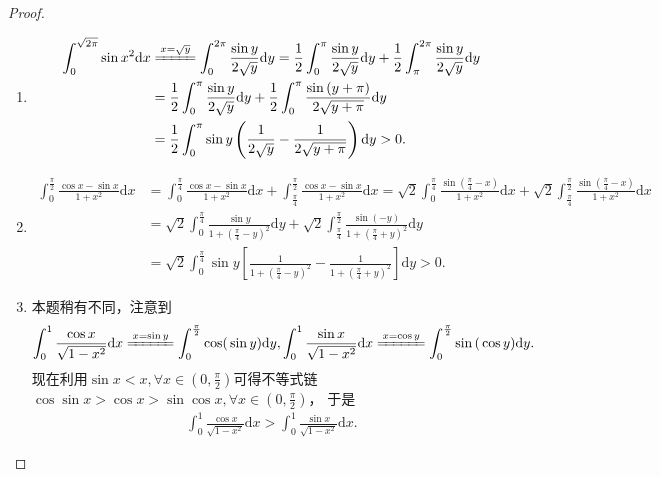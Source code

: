 \documentclass[../../main.tex]{subfiles}%
\begin{document}
\begin{proof}
\begin{enumerate}
\item \begin{align*}
\int_0^{\sqrt{2\pi}}{\sin x^2\mathrm{d}x}&\xlongequal{x=\sqrt{y}}\int_0^{2\pi}{\frac{\sin y}{2\sqrt{y}}\mathrm{d}y}=\frac{1}{2}\int_0^{\pi}{\frac{\sin y}{2\sqrt{y}}\mathrm{d}y}+\frac{1}{2}\int_{\pi}^{2\pi}{\frac{\sin y}{2\sqrt{y}}\mathrm{d}y}
\\
&=\frac{1}{2}\int_0^{\pi}{\frac{\sin y}{2\sqrt{y}}\mathrm{d}y}+\frac{1}{2}\int_0^{\pi}{\frac{\sin \left( y+\pi \right)}{2\sqrt{y+\pi}}\mathrm{d}y}
\\
&=\frac{1}{2}\int_0^{\pi}{\sin y\left( \frac{1}{2\sqrt{y}}-\frac{1}{2\sqrt{y+\pi}} \right) \mathrm{d}y}>0.
\end{align*}

\item \begin{align*}
\int_0^{\frac{\pi}{2}}{\frac{\cos x-\sin x}{1+x^2}\mathrm{d}x}&=\int_0^{\frac{\pi}{4}}{\frac{\cos x-\sin x}{1+x^2}\mathrm{d}x}+\int_{\frac{\pi}{4}}^{\frac{\pi}{2}}{\frac{\cos x-\sin x}{1+x^2}\mathrm{d}x}=\sqrt{2}\int_0^{\frac{\pi}{4}}{\frac{\sin \left( \frac{\pi}{4}-x \right)}{1+x^2}\mathrm{d}x}+\sqrt{2}\int_{\frac{\pi}{4}}^{\frac{\pi}{2}}{\frac{\sin \left( \frac{\pi}{4}-x \right)}{1+x^2}\mathrm{d}x}
\\
&=\sqrt{2}\int_0^{\frac{\pi}{4}}{\frac{\sin y}{1+\left( \frac{\pi}{4}-y \right) ^2}\mathrm{d}y}+\sqrt{2}\int_{\frac{\pi}{4}}^{\frac{\pi}{2}}{\frac{\sin \left( -y \right)}{1+\left( \frac{\pi}{4}+y \right) ^2}\mathrm{d}y}
\\
&=\sqrt{2}\int_0^{\frac{\pi}{4}}{\sin y\left[ \frac{1}{1+\left( \frac{\pi}{4}-y \right) ^2}-\frac{1}{1+\left( \frac{\pi}{4}+y \right) ^2} \right] \mathrm{d}y}>0.
\end{align*}

\item 本题稍有不同，注意到
\begin{align*}
\int_0^1{\frac{\cos x}{\sqrt{1-x^2}}\mathrm{d}x\xlongequal{x=\sin y}\int_0^{\frac{\pi}{2}}{\mathrm{cos(}\sin y)\mathrm{d}y,\int_0^1{\frac{\sin x}{\sqrt{1-x^2}}\mathrm{d}x\xlongequal{x=\cos y}\int_0^{\frac{\pi}{2}}{\sin\mathrm{(}\cos y)\mathrm{d}y}}}}.
\end{align*}
现在利用\(\sin x < x, \forall x \in (0, \frac{\pi}{2})\)可得不等式链
\(\cos\sin x > \cos x > \sin\cos x, \forall x \in (0, \frac{\pi}{2})\)，
于是
\begin{align*}
\int_{0}^{1}\frac{\cos x}{\sqrt{1 - x^{2}}}\mathrm{d}x > \int_{0}^{1}\frac{\sin x}{\sqrt{1 - x^{2}}}\mathrm{d}x.
\end{align*} 
\end{enumerate}
\end{proof}
\end{document}
